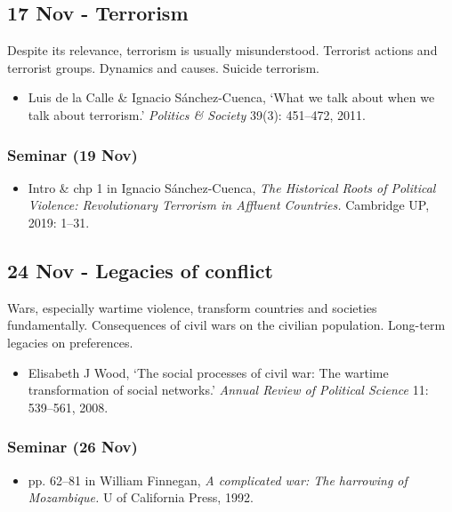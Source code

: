 \documentclass[12pt, a4paper]{article}
\begin{document}
\subsection*{17 Nov - Terrorism}

Despite its relevance, terrorism is usually misunderstood. Terrorist actions and terrorist groups. Dynamics and causes. Suicide terrorism.

\begin{itemize}
\setlength\itemsep{0pt}
\item Luis de la Calle \& Ignacio Sánchez-Cuenca, `What we talk about when we talk about terrorism.' \textit{Politics \& Society} 39(3): 451--472, 2011.
\end{itemize}

\subsubsection*{Seminar (19 Nov)}

\begin{itemize}
\setlength\itemsep{0pt}
\item Intro \& chp 1 in Ignacio Sánchez-Cuenca, \textit{The Historical Roots of Political Violence: Revolutionary Terrorism in Affluent Countries.} Cambridge UP, 2019: 1--31.
\end{itemize}

\subsection*{24 Nov - Legacies of conflict}

Wars, especially wartime violence, transform countries and societies fundamentally. Consequences of civil wars on the civilian population. Long-term legacies on preferences.

\begin{itemize}
\setlength\itemsep{0pt}
\item Elisabeth J Wood, `The social processes of civil war: The wartime transformation of social networks.' \textit{Annual Review of Political Science} 11: 539--561, 2008.
\end{itemize}

\subsubsection*{Seminar (26 Nov)}

\begin{itemize}
\setlength\itemsep{0pt}
\item pp. 62--81 in William Finnegan, \textit{A complicated war: The harrowing of Mozambique.} U of California Press, 1992.
\end{itemize}
\end{document}
